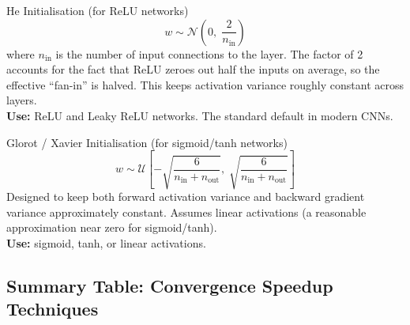 \documentclass[11pt,a4paper]{article}
\begin{document}
\begin{defbox}{He Initialisation (for ReLU networks)}
\[
w \sim \mathcal{N}\!\left(0,\; \frac{2}{n_{\mathrm{in}}}\right)
\]
where $n_{\mathrm{in}}$ is the number of input connections to the layer. The factor of 2 accounts for the fact that ReLU zeroes out half the inputs on average, so the effective ``fan-in'' is halved. This keeps activation variance roughly constant across layers.\\
\textbf{Use:} ReLU and Leaky ReLU networks. The standard default in modern CNNs.
\end{defbox}

\begin{defbox}{Glorot / Xavier Initialisation (for sigmoid/tanh networks)}
\[
w \sim \mathcal{U}\!\left[-\sqrt{\frac{6}{n_{\mathrm{in}} + n_{\mathrm{out}}}},\; \sqrt{\frac{6}{n_{\mathrm{in}} + n_{\mathrm{out}}}}\right]
\]
Designed to keep both forward activation variance and backward gradient variance approximately constant. Assumes linear activations (a reasonable approximation near zero for sigmoid/tanh).\\
\textbf{Use:} sigmoid, tanh, or linear activations.
\end{defbox}

\subsection{Summary Table: Convergence Speedup Techniques}
\end{document}
